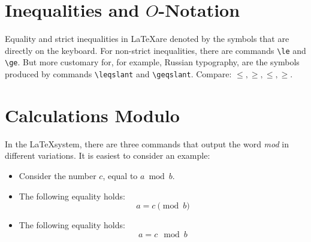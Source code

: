 \section{Inequalities and \(O\)-Notation}
\par Equality and strict inequalities in \LaTeX are denoted by the symbols that are directly on the keyboard. For non-strict inequalities, there are commands \verb"\le" and \verb"\ge". But more customary for, for example, Russian typography, are the symbols produced by commands \verb"\leqslant" and \verb"\geqslant". Compare: \(\le,\ge,\leqslant,\geqslant\).

\section{Calculations Modulo}
\par In the \LaTeX system, there are three commands that output the word \emph{mod} in different variations. It is easiest to consider an example:
\begin{itemize}
\item Consider the number \(c\), equal to \(a\bmod b\).
\item The following equality holds: \[a=c\pmod{b}\]
\item The following equality holds: \[a=c\mod b\]
\end{itemize}
